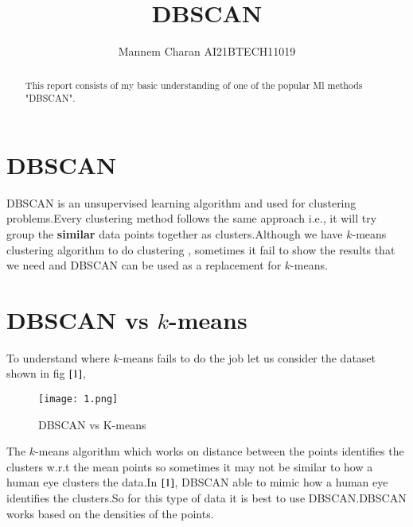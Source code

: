 \documentclass[journal,12pt,onecolumn]{IEEEtran}
\theoremstyle{remark}
\numberwithin{equation}{section}
\begin{document}
		\title{DBSCAN}
		\author{ Mannem Charan AI21BTECH11019}
		 \maketitle
		\begin{abstract}
			This report consists of my basic understanding of one of the popular Ml methods "DBSCAN".
		\end{abstract}
		\section{DBSCAN}
		  DBSCAN is an unsupervised learning algorithm and used for clustering problems.Every clustering method follows the same approach i.e., it will try group the \textbf{similar} data points together as clusters.Although we have $k$-means clustering algorithm to do clustering , sometimes it fail to show the results that we need and DBSCAN can be used as a replacement for $k$-means.
		 \section{DBSCAN vs $k$-means}
		   To understand where $k$-means fails to do the job let us consider the dataset shown in fig $\ref{1}$,
		     \begin{figure}[ht!]
		      \centering
	              \texttt{[image: 1.png]}
		      \caption{DBSCAN vs K-means}
		      \label{1}
		     \end{figure}
          The $k$-means algorithm which works on distance between the points identifies the clusters w.r.t the mean points so sometimes it may not be similar to how a human eye clusters the data.In $\ref{1}$, DBSCAN able to mimic how a human eye identifies the clusters.So for this type of data it is best to use DBSCAN.DBSCAN works based on the densities of the points.
\end{document}
